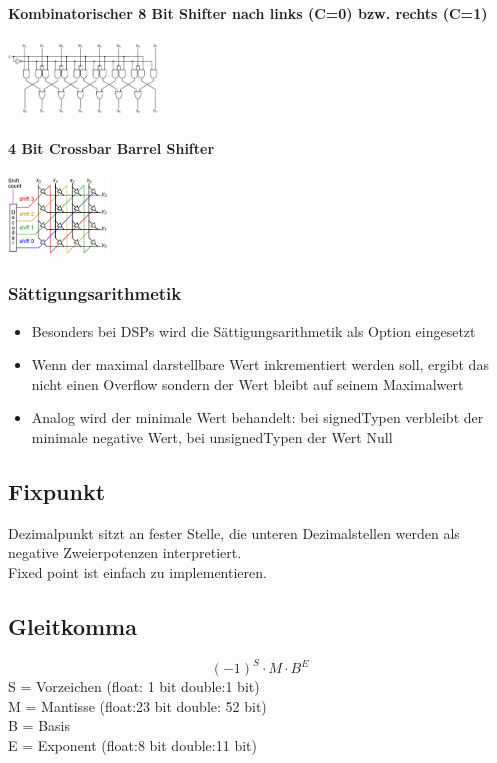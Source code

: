\begin{multicols}{2}
	\paragraph{Kombinatorischer 8 Bit Shifter nach links (C=0) bzw. rechts (C=1)}
	\includegraphics[width=0.3\textwidth]{images/Arithmetik/Shifter_1}

	\paragraph{4 Bit Crossbar Barrel Shifter}
	\includegraphics[width=0.2\textwidth]{images/Arithmetik/Shifter_2}
\end{multicols}

\subsubsection{Sättigungsarithmetik}
\begin{itemize}
	\item Besonders bei DSPs wird die Sättigungsarithmetik als Option eingesetzt 
	\item Wenn der maximal darstellbare Wert inkrementiert werden soll, ergibt das nicht einen Overflow sondern der Wert bleibt auf seinem Maximalwert 
	\item Analog wird der minimale Wert behandelt: bei signedTypen verbleibt der minimale negative Wert, bei unsignedTypen der Wert Null
\end{itemize}

\subsection{Fixpunkt}
Dezimalpunkt sitzt an fester Stelle, die unteren Dezimalstellen werden als negative Zweierpotenzen interpretiert. \\
Fixed point ist einfach zu implementieren. 
\subsection{Gleitkomma}
\begin{equation}
(-1)^S\cdot M \cdot B^E
\end{equation}
S = Vorzeichen (float: 1 bit double:1 bit)\\
M = Mantisse (float:23 bit double: 52 bit)\\
B = Basis \\
E = Exponent (float:8 bit double:11 bit)\\

